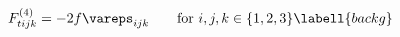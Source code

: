 \begin{equation}
F^{(4)}_{tijk}=-2f \vareps_{ijk}\qquad{\rm for}\ i,j,k\in
\lbrace 1,2,3\rbrace
\labell{backg}
\end{equation}

